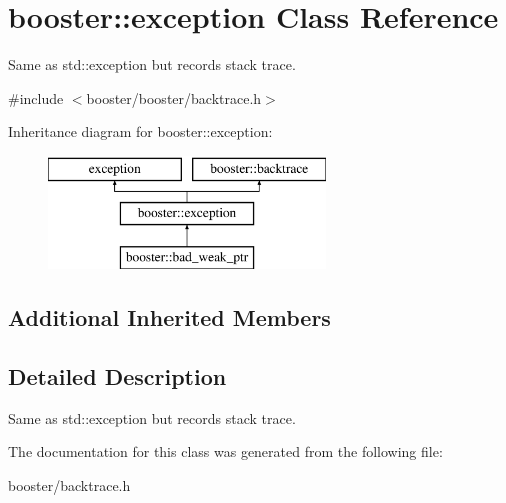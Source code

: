 \section{booster\-:\-:exception Class Reference}
\label{classbooster_1_1exception}


Same as std\-::exception but records stack trace.  




{\ttfamily \#include $<$booster/booster/backtrace.\-h$>$}

Inheritance diagram for booster\-:\-:exception\-:\begin{figure}[H]
\begin{center}
\leavevmode
\includegraphics[height=3.000000cm]{classbooster_1_1exception}
\end{center}
\end{figure}
\subsection*{Additional Inherited Members}


\subsection{Detailed Description}
Same as std\-::exception but records stack trace. 

The documentation for this class was generated from the following file\-:\begin{DoxyCompactItemize}
\item 
booster/backtrace.\-h\end{DoxyCompactItemize}
